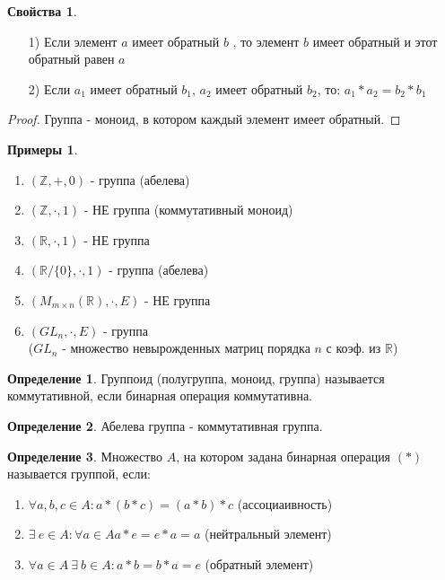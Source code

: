 \documentclass[a4paper, 12pt]{article}
\newcommand{\R}{\mathbb R}
\newcommand{\Z}{\mathbb Z}
\newcommand\tab[1][.5cm]{\hspace*{#1}}
\theoremstyle{definition}
\newtheorem*{definition}{Определение}
\newtheorem*{example}{Примеры}
\newtheorem*{properties}{Свойства}
\begin{document}
  \begin{properties}
    \begin{itemize} \tab
      \item[1)] Если элемент $a$  имеет обратный $b$ , то элемент $b$ имеет обратный и этот обратный равен $a$
      \item[2)] Если $a_1$ имеет обратный $b_1$, $a_2$ имеет обратный $b_2$, то: $a_1*a_2 = b_2*b_1$ 
    \end{itemize}
  \end{properties}
  \begin{proof}
    Группа - моноид, в котором каждый элемент имеет обратный.
  \end{proof} 
  \begin{example}
    \begin{enumerate} \tab
      \item $(\Z, +, 0)$ - группа (абелева)
      \item $(\Z, \cdot, 1)$ - НЕ группа (коммутативный моноид)
      \item $(\R, \cdot, 1)$ - НЕ группа
      \item $(\R/\{0\}, \cdot, 1)$ - группа (абелева)
      \item $(M_{m \times n}(\R), \cdot, E)$ - НЕ группа
      \item $(GL_n, \cdot, E)$ - группа \\($GL_n$ - множество невырожденных матриц порядка $n$ с коэф. из $\R$)
    \end{enumerate}
  \end{example}
  \begin{definition}
    Группоид (полугруппа, моноид, группа) называется коммутативной, если бинарная операция коммутативна.
  \end{definition} 
  \begin{definition}
    Абелева группа - коммутативная группа. 
  \end{definition} 
  \begin{definition}
    Множество $A$, на котором задана бинарная операция $(*)$ называется группой, если:
    \begin{enumerate}
      \item  $\forall a,b,c \in A: a*(b*c)=(a*b)*c$ (ассоциаивность)
      \item $\exists \ e \in A: \forall a \in A a*e = e*a = a$ (нейтральный элемент)
      \item $\forall a \in A \ \exists \ b \in A: a*b = b*a = e $ (обратный элемент)
    \end{enumerate}
  \end{definition} 
\end{document}
